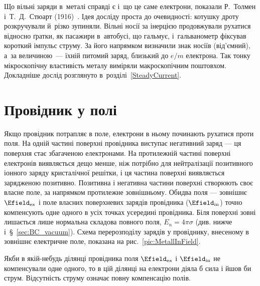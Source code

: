 Що вільні заряди в~металі справді є і~що це саме електрони, показали
Р.~Толмен і~Т.~Д.~Стюарт (1916)~\cite{Tolman1916}. Ідея досліду проста до
очевидності: котушку дроту розкручували й~різко зупиняли. Вільні носії за інерцією
продовжували рухатися відносно ґратки, як пасажири в~автобусі, що гальмує, і~гальванометр
фіксував короткий імпульс струму. За його напрямком визначили знак носіїв (від'ємний), а~за
величиною~--- їхній питомий заряд, близький до $e/m$ електрона. Так тонку мікроскопічну
властивість металу виміряли макроскопічним поштовхом. Докладніше дослід розглянуто
в~розділі~\ref{SteadyCurrent}.


\section{Провідник у полі}\label{sec:ConductorInField}\hypertarget{conductor-in-field}{}


Якщо провідник потрапляє в поле, електрони в ньому починають рухатися проти поля.
На одній частині поверхні провідника виступає негативний заряд --- ця поверхня стає
збагаченою електронами. На протилежній частині поверхні
електронів виявляється дещо менше, ніж потрібно для нейтралізації позитивного
іонного заряду кристалічної решітки, і ця частина поверхні виявляється зарядженою
позитивно. Позитивна і негативна частини поверхні створюють своє власне поле, за
напрямком протилежне зовнішньому. Обидва поля --- зовнішнє $\Efield_\text{ex}$ і
поле власних     поверхневих зарядів провідника ($\Efield_\text{in}$) точно
компенсують одне одного в усіх точках усередині провідника. Біля поверхні зовні лишається лише нормальна складова повного поля,
$E_n=4\pi\sigma$ (див. нижче і~\S~\ref{sec:BC_vacuum}). Схема перерозподілу зарядів у провіднику,
внесеному в зовнішнє електричне поле, показана на рис.~\ref{pic:MetallInField}.

Якби в якій-небудь ділянці провідника поля $\Efield_\text{ex}$ і $\Efield_\text{in}$
не компенсували одне одного, то в цій ділянці на електрони діяла б сила і йшов би
струм. Відсутність струму означає повну компенсацію полів.


